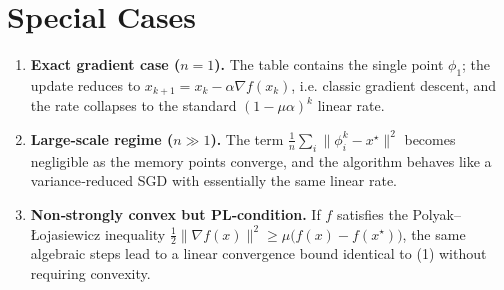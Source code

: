 \documentclass{article}
\begin{document}
\section*{Special Cases}
\begin{enumerate}[label=\arabic*)]
\item \textbf{Exact gradient case (\(n=1\)).}
The table contains the single point \(\phi_1\); the update reduces to
\(x_{k+1}=x_k-\alpha\nabla f(x_k)\), i.e. classic gradient descent,
and the rate collapses to the standard \((1-\mu\alpha)^{k}\) linear rate.
\item \textbf{Large‑scale regime (\(n\gg 1\)).}
The term \(\frac{1}{n}\sum_i\|\phi_i^{k}-x^{\star}\|^{2}\) becomes negligible
as the memory points converge, and the algorithm behaves like a variance‑reduced SGD with essentially the same linear rate.
\item \textbf{Non‑strongly convex but PL‑condition.}
If \(f\) satisfies the Polyak–Łojasiewicz inequality
\( \frac{1}{2}\|\nabla f(x)\|^{2}\ge \mu\bigl(f(x)-f(x^{\star})\bigr) \),
the same algebraic steps lead to a linear convergence bound identical to (1) without requiring convexity.
\end{enumerate}
\end{document}
